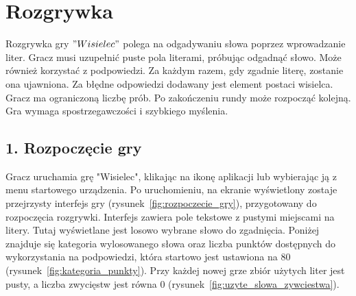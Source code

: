 \documentclass[]{report}
\begin{document}
\newpage
\section *{Rozgrywka}

Rozgrywka gry $"Wisielec"$ polega na odgadywaniu słowa poprzez wprowadzanie liter. Gracz musi uzupełnić puste pola literami, próbując odgadnąć słowo. Może również korzystać z podpowiedzi. Za każdym razem, gdy zgadnie literę, zostanie ona ujawniona. Za błędne odpowiedzi dodawany jest element postaci wisielca. Gracz ma ograniczoną liczbę prób. Po zakończeniu rundy może rozpocząć kolejną. Gra wymaga spostrzegawczości i szybkiego myślenia.

\subsection*{1. Rozpoczęcie gry}

Gracz uruchamia grę "Wisielec", klikając na ikonę aplikacji lub wybierając ją z menu startowego urządzenia. Po uruchomieniu, na ekranie wyświetlony zostaje przejrzysty interfejs gry (rysunek~\ref{fig:rozpoczecie_gry}), przygotowany do rozpoczęcia rozgrywki. Interfejs zawiera pole tekstowe z pustymi miejscami na litery. Tutaj wyświetlane jest losowo wybrane słowo do zgadnięcia. Poniżej znajduje się kategoria wylosowanego słowa oraz liczba punktów dostępnych do wykorzystania na podpowiedzi, która startowo jest ustawiona na 80 (rysunek~\ref{fig:kategoria_punkty}). Przy każdej nowej grze zbiór użytych liter jest pusty, a liczba zwycięstw jest równa 0 (rysunek~\ref{fig:uzyte_slowa_zywciestwa}).

\vspace{0.5cm}
\end{document}
